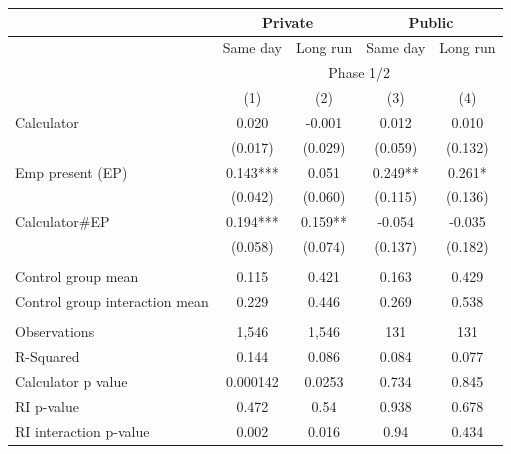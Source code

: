 \begin{tabular}{lcccc}
\toprule
\multicolumn{1}{r|}{} & \multicolumn{2}{c|}{Private} & \multicolumn{2}{c|}{Public} \\
\midrule
      & Same day  & Long run & Same day  & Long run \\
\midrule
      & \multicolumn{4}{c}{Phase 1/2} \\
\midrule
\midrule
      & (1)   & (2)   & (3)   & (4) \\
\midrule
\midrule
Calculator   & 0.020 & -0.001 & 0.012 & 0.010 \\
      & (0.017) & (0.029) & (0.059) & (0.132) \\
Emp present (EP) & 0.143*** & 0.051 & 0.249** & 0.261* \\
      & (0.042) & (0.060) & (0.115) & (0.136) \\
Calculator\#EP & 0.194*** & 0.159** & -0.054 & -0.035 \\
      & (0.058) & (0.074) & (0.137) & (0.182) \\
      &       &       &       &  \\
\midrule
Control group mean & 0.115 & 0.421 & 0.163 & 0.429 \\
Control group interaction mean & 0.229 & 0.446 & 0.269 & 0.538 \\
\midrule
      &       &       &       &  \\
\midrule
Observations & 1,546 & 1,546 & 131   & 131 \\
R-Squared & 0.144 & 0.086 & 0.084 & 0.077 \\
Calculator p value & 0.000142 & 0.0253 & 0.734 & 0.845 \\
RI p-value & 0.472 & 0.54  & 0.938 & 0.678 \\
RI interaction p-value & 0.002 & 0.016 & 0.94  & 0.434 \\
\bottomrule
\bottomrule
\end{tabular}%
